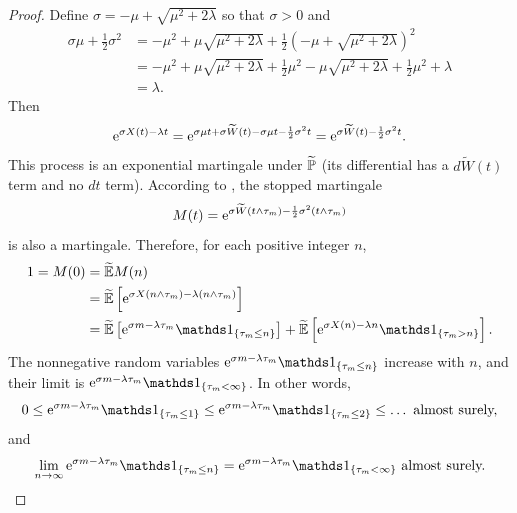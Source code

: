 \begin{proof}

	Define \(\sigma = -\mu + \sqrt{\mu^2 + 2\lambda}\) so that \(\sigma > 0\) and
	\begin{align*}
		\sigma \mu + \frac{1}{2}\sigma^2 & = -\mu^2 + \mu\sqrt{\mu^2 + 2\lambda} + \frac{1}{2}\left(-\mu + \sqrt{\mu^2 + 2\lambda}\right)^2                   \\
		                                 & = -\mu^2 + \mu\sqrt{\mu^2 + 2\lambda} + \frac{1}{2}\mu^2 - \mu\sqrt{\mu^2 + 2\lambda} + \frac{1}{2}\mu^2 + \lambda \\
		                                 & = \lambda.
	\end{align*}
	Then
	\[
		\mathrm{e}^{\sigma X(t)-\lambda t} = \mathrm{e}^{\sigma \mu t + \sigma \widetilde{W}(t) - \sigma \mu t - \frac{1}{2}\sigma^2 t} = \mathrm{e}^{\sigma \widetilde{W}(t) - \frac{1}{2}\sigma^2 t}.
	\]
	This process is an exponential martingale under \(\widetilde{\mathbb{P}}\) (its differential has a \(d\widetilde{W}(t)\) term and no \(dt\) term). According to , the stopped martingale
	\[
		M(t) = \mathrm{e}^{\sigma \widetilde{W}(t \wedge \tau_m) - \frac{1}{2}\sigma^2 (t \wedge \tau_m)}
	\]
	is also a martingale. Therefore, for each positive integer \(n\),
	\begin{align}
		1 = M(0) & = \widetilde{\E}M(n) \nonumber                                                                                                                                                            \\
		         & = \widetilde{\E}\left[\e^{\sigma X(n \wedge \tau_m) - \lambda(n \wedge \tau_m)}\right] \nonumber                                                                                          \\
		         & = \widetilde{\E}\left[\e^{\sigma m - \lambda \tau_m}\I_{\{\tau_m \le n\}}\right] + \widetilde{\E}\left[\e^{\sigma X(n) - \lambda n}\I_{\{\tau_m > n\}}\right]. \label{eq:MartingaleSplit}
	\end{align}
	The nonnegative random variables \(\e^{\sigma m - \lambda \tau_m}\I_{\{\tau_m \le n\}}\) increase with \(n\), and their limit is \(\e^{\sigma m - \lambda \tau_m}\I_{\{\tau_m < \infty\}}\). In other words,
	\[
		0 \le \e^{\sigma m - \lambda \tau_m}\I_{\{\tau_m \le 1\}} \le \e^{\sigma m - \lambda \tau_m}\I_{\{\tau_m \le 2\}} \le \dots \text{ almost surely,}
	\]
	and
	\[
		\lim_{n \to \infty} \e^{\sigma m - \lambda \tau_m}\I_{\{\tau_m \le n\}} = \e^{\sigma m - \lambda \tau_m}\I_{\{\tau_m < \infty\}} \text{ almost surely.}
\]
\end{proof}
